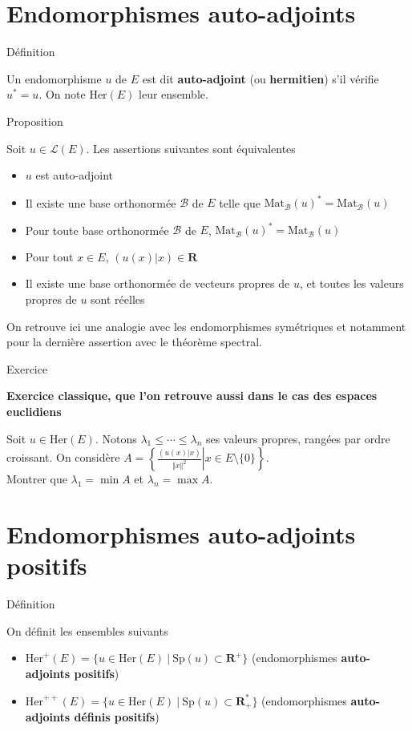 \documentclass[a4paper,11pt]{article}
\newcommand{\R}{\mathbf{R}}
\newcommand{\B}{\mathcal{B}}
\renewcommand{\L}{\mathcal{L}}
\newenvironment{gbar}[1]{%
		\def\FrameCommand{{\color{#1}\vrule width 3pt }
		\colorbox{gris2}} %
		\MakeFramed{\advance\hsize -\width\FrameRestore}} %
		{\endMakeFramed}
\newenvironment{cadre}[2]{
		\begin{bclogo}[couleur = gris , barre = none , noborder = true , logo=\vspace{1em}]{
			\hspace{.14em}
			\colorbox{#1}{
				\parbox{15em}{
				\sffamily\normalsize{\color{gris}#2}
			}}
			\vspace{.2em}
		}
			\begin{gbar}{#1}
	}
	{
			\end{gbar}
		\end{bclogo}
	}
\begin{document}
\section{Endomorphismes auto-adjoints}
\begin{cadre}{bleu}{Définition}
Un endomorphisme $u$ de $E$ est dit {\sffamily\color{blue}\textbf{auto-adjoint}} (ou {\sffamily\color{blue}\textbf{hermitien}}) s'il vérifie $u^*=u$. On note $\mathrm{Her}(E)$ leur ensemble.
\end{cadre}

\begin{cadre}{rouge}{Proposition}
Soit $u\in\L(E)$. Les assertions suivantes sont équivalentes
\begin{itemize}[label={\color{rouge}•}]
\item $u$ est auto-adjoint
\item Il existe une base orthonormée $\B$ de $E$ telle que $\mathrm{Mat}_\B(u)^*=\mathrm{Mat}_\B(u)$
\item Pour toute base orthonormée $\B$ de $E$, $\mathrm{Mat}_\B(u)^*=\mathrm{Mat}_\B(u)$
\item Pour tout $x\in E$, $(u(x)\vert x)\in\R$
\item Il existe une base orthonormée de vecteurs propres de $u$, et toutes les valeurs propres de $u$ sont réelles
\end{itemize}
\end{cadre}
On retrouve ici une analogie avec les endomorphismes symétriques et notamment pour la dernière assertion avec le théorème spectral.

\begin{cadre}{jaune}{Exercice}
{\sffamily\textbf{\color{jaune} Exercice classique, que l'on retrouve aussi dans le cas des espaces euclidiens}}

Soit $u\in\mathrm{Her}(E)$. Notons $\lambda_1\leq\cdots\leq\lambda_n$ ses valeurs propres, rangées par ordre croissant. On considère $A=\left\lbrace\frac{(u(x)\vert x)}{\Vert x\Vert^2}\left|\right. x\in E\setminus\{0\}\right\rbrace$.\\

Montrer que $\lambda_1=\min A$ et $\lambda_n=\max A$.
\end{cadre}

\section{Endomorphismes auto-adjoints positifs}
\begin{cadre}{bleu}{Définition}
On définit les ensembles suivants
\begin{itemize}[label={\color{bleu}•}]
\item $\mathrm{Her}^+(E)=\{u\in\mathrm{Her}(E)\ \vert\ \mathrm{Sp}(u)\subset\R^+\}$ (endomorphismes {\sffamily\color{blue}\textbf{auto-adjoints positifs}})
\item $\mathrm{Her}^{++}(E)=\{u\in\mathrm{Her}(E)\ \vert\ \mathrm{Sp}(u)\subset\R^*_+\}$ (endomorphismes {\sffamily\color{blue}\textbf{auto-adjoints définis positifs}})
\end{itemize}
\end{cadre}
\end{document}
